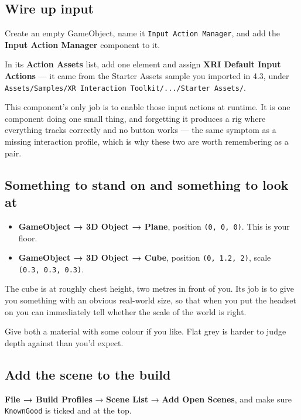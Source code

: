 \documentclass[11pt,a4paper]{article}
\providecommand{\tightlist}{\setlength{\itemsep}{2pt}\setlength{\parskip}{0pt}}
\begin{document}
\subsection{Wire up input}\label{wire-up-input}

Create an empty GameObject, name it \texttt{Input\ Action\ Manager}, and add the \textbf{Input Action
Manager} component to it.

In its \textbf{Action Assets} list, add one element and assign \textbf{XRI Default Input Actions} ---
it came from the Starter Assets sample you imported in 4.3, under
\texttt{Assets/Samples/XR\ Interaction\ Toolkit/.../Starter\ Assets/}.

This component's only job is to enable those input actions at runtime. It is one component
doing one small thing, and forgetting it produces a rig where everything tracks correctly
and no button works --- the same symptom as a missing interaction profile, which is why
these two are worth remembering as a pair.

\subsection{Something to stand on and something to look at}\label{something-to-stand-on-and-something-to-look-at}

\begin{itemize}
\tightlist
\item
  \textbf{GameObject → 3D Object → Plane}, position \texttt{(0,\ 0,\ 0)}. This is your floor.
\item
  \textbf{GameObject → 3D Object → Cube}, position \texttt{(0,\ 1.2,\ 2)}, scale \texttt{(0.3,\ 0.3,\ 0.3)}.
\end{itemize}

The cube is at roughly chest height, two metres in front of you. Its job is to give you
something with an obvious real-world size, so that when you put the headset on you can
immediately tell whether the scale of the world is right.

Give both a material with some colour if you like. Flat grey is harder to judge depth
against than you'd expect.

\subsection{Add the scene to the build}\label{add-the-scene-to-the-build}

\textbf{File → Build Profiles} → \textbf{Scene List} → \textbf{Add Open Scenes}, and make sure
\texttt{KnownGood} is ticked and at the top.
\end{document}
